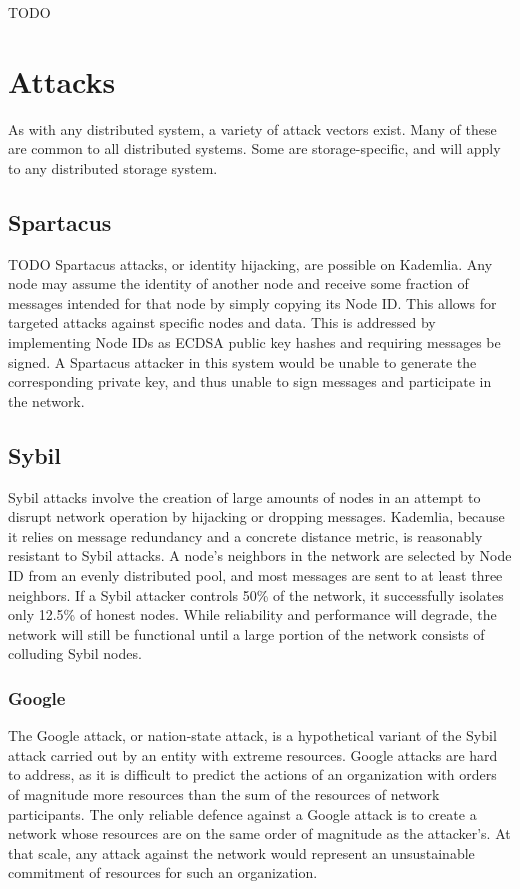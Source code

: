 \documentclass[a4paper,10pt]{article}
\newcommand{\todo}[1]{{\color{red} TODO #1}}
\begin{document}
\todo{}

\newpage
\appendix

\section{Attacks}

As with any distributed system, a variety of attack vectors exist. Many of these
are common to all distributed systems. Some are storage-specific, and will apply
to any distributed storage system.

\subsection{Spartacus}

\todo{
Spartacus attacks, or identity hijacking, are possible on Kademlia. Any node may
assume the identity of another node and receive some fraction of messages
intended for that node by simply copying its Node ID. This allows for targeted
attacks against specific nodes and data. This is addressed by implementing Node
IDs as ECDSA public key hashes and requiring messages be signed. A Spartacus
attacker in this system would be unable to generate the corresponding private
key, and thus unable to sign messages and participate in the network.
}

\subsection{Sybil}

Sybil attacks involve the creation of large amounts of nodes in an attempt to
disrupt network operation by hijacking or dropping messages. Kademlia, because
it relies on message redundancy and a concrete distance metric, is reasonably
resistant to Sybil attacks. A node’s neighbors in the network are selected by
Node ID from an evenly distributed pool, and most messages are sent to at least
three neighbors. If a Sybil attacker controls 50\% of the network, it
successfully isolates only 12.5\% of honest nodes. While reliability and
performance will degrade, the network will still be functional until a large
portion of the network consists of colluding Sybil nodes.

\subsubsection{Google}

The Google attack, or nation-state attack, is a hypothetical variant of the
Sybil attack carried out by an entity with extreme resources. Google attacks are
hard to address, as it is difficult to predict the actions of an organization
with orders of magnitude more resources than the sum of the resources of network
participants. The only reliable defence against a Google attack is to create a
network whose resources are on the same order of magnitude as the attacker’s. At
that scale, any attack against the network would represent an unsustainable
commitment of resources for such an organization.
\end{document}
